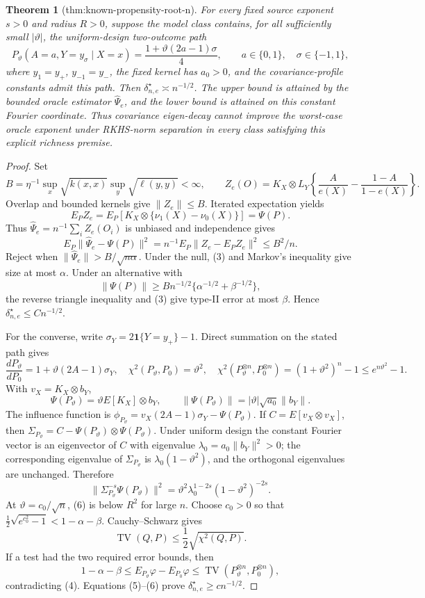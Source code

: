 \documentclass{article}
\newtheorem{theorem}{Theorem}
\begin{document}
\begin{theorem}[thm:known-propensity-root-n]\label{thm:known-propensity-root-n}
For every fixed source exponent \(s>0\) and radius \(R>0\), suppose the model class contains, for all sufficiently small \(|\vartheta|\), the uniform-design two-outcome path
\[
P_\vartheta(A=a,Y=y_\sigma\mid X=x)
=\frac{1+\vartheta(2a-1)\sigma}{4},
\qquad a\in\{0,1\},\quad \sigma\in\{-1,1\},
\]
where \(y_1=y_+\), \(y_{-1}=y_-\), the fixed kernel has \(a_0>0\), and the covariance-profile constants admit this path. Then \(\delta_{n,e}^\star\asymp n^{-1/2}\). The upper bound is attained by the bounded oracle estimator \(\widehat\Psi_e\), and the lower bound is attained on this constant Fourier coordinate. Thus covariance eigen-decay cannot improve the worst-case oracle exponent under RKHS-norm separation in every class satisfying this explicit richness premise.
\end{theorem}
\begin{proof}
Set
\[
B=\eta^{-1}\sup_x\sqrt{k(x,x)}\sup_y\sqrt{\ell(y,y)}<\infty,\qquad
Z_e(O)=K_X\otimes L_Y\left\{\frac A{e(X)}-\frac{1-A}{1-e(X)}\right\}.
\]
Overlap and bounded kernels give \(\|Z_e\|\le B\). Iterated expectation yields
\[
E_PZ_e=E_P[K_X\otimes\{\nu_1(X)-\nu_0(X)\}]=\Psi(P). \tag{2}
\]
Thus \(\widehat\Psi_e=n^{-1}\sum_iZ_e(O_i)\) is unbiased and independence gives
\[
E_P\|\widehat\Psi_e-\Psi(P)\|^2
=n^{-1}E_P\|Z_e-E_PZ_e\|^2\le B^2/n. \tag{3}
\]
Reject when \(\|\widehat\Psi_e\|>B/\sqrt{n\alpha}\). Under the null, (3) and Markov's inequality give size at most \(\alpha\). Under an alternative with
\[
\|\Psi(P)\|\ge Bn^{-1/2}\{\alpha^{-1/2}+\beta^{-1/2}\},
\]
the reverse triangle inequality and (3) give type-II error at most \(\beta\). Hence \(\delta_{n,e}^\star\le Cn^{-1/2}\).

For the converse, write \(\sigma_Y=2\mathbf1\{Y=y_+\}-1\). Direct summation on the stated path gives
\[
\frac{dP_\vartheta}{dP_0}=1+\vartheta(2A-1)\sigma_Y,\quad
\chi^2(P_\vartheta,P_0)=\vartheta^2,\quad
\chi^2(P_\vartheta^{\otimes n},P_0^{\otimes n})
=(1+\vartheta^2)^n-1\le e^{n\vartheta^2}-1. \tag{4}
\]
With \(v_X=K_X\otimes b_Y\),
\[
\Psi(P_\vartheta)=\vartheta E[K_X]\otimes b_Y,\qquad
\|\Psi(P_\vartheta)\|=|\vartheta|\sqrt{a_0}\|b_Y\|. \tag{5}
\]
The influence function is \(\phi_{P_\vartheta}=v_X(2A-1)\sigma_Y-\Psi(P_\vartheta)\). If \(C=E[v_X\otimes v_X]\), then \(\Sigma_{P_\vartheta}=C-\Psi(P_\vartheta)\otimes\Psi(P_\vartheta)\). Under uniform design the constant Fourier vector is an eigenvector of \(C\) with eigenvalue \(\lambda_0=a_0\|b_Y\|^2>0\); the corresponding eigenvalue of \(\Sigma_{P_\vartheta}\) is \(\lambda_0(1-\vartheta^2)\), and the orthogonal eigenvalues are unchanged. Therefore
\[
\|\Sigma_{P_\vartheta}^{-s}\Psi(P_\vartheta)\|^2
=\vartheta^2\lambda_0^{1-2s}(1-\vartheta^2)^{-2s}. \tag{6}
\]
At \(\vartheta=c_0/\sqrt n\), (6) is below \(R^2\) for large \(n\). Choose \(c_0>0\) so that \(\frac12\sqrt{e^{c_0^2}-1}<1-\alpha-\beta\). Cauchy--Schwarz gives
\[
\operatorname{TV}(Q,P)\le\frac12\sqrt{\chi^2(Q,P)}.
\]
If a test had the two required error bounds, then
\[
1-\alpha-\beta\le E_{P_\vartheta}\varphi-E_{P_0}\varphi
\le\operatorname{TV}(P_\vartheta^{\otimes n},P_0^{\otimes n}),
\]
contradicting (4). Equations (5)--(6) prove \(\delta_{n,e}^\star\ge cn^{-1/2}\).
\end{proof}
\end{document}
